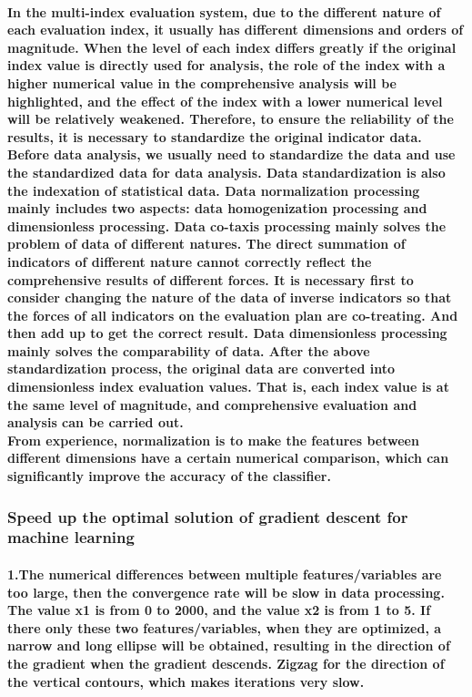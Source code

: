 \documentclass{article}
\begin{document}
\paragraph{In the multi-index evaluation system, due to the different nature of each evaluation index, it usually has different dimensions and orders of magnitude. When the level of each index differs greatly if the original index value is directly used for analysis, the role of the index with a higher numerical value in the comprehensive analysis will be highlighted, and the effect of the index with a lower numerical level will be relatively weakened. Therefore, to ensure the reliability of the results, it is necessary to standardize the original indicator data.
\\Before data analysis, we usually need to standardize the data and use the standardized data for data analysis. Data standardization is also the indexation of statistical data. Data normalization processing mainly includes two aspects: data homogenization processing and dimensionless processing. Data co-taxis processing mainly solves the problem of data of different natures. The direct summation of indicators of different nature cannot correctly reflect the comprehensive results of different forces. It is necessary first to consider changing the nature of the data of inverse indicators so that the forces of all indicators on the evaluation plan are co-treating. And then add up to get the correct result. Data dimensionless processing mainly solves the comparability of data. After the above standardization process, the original data are converted into dimensionless index evaluation values. That is, each index value is at the same level of magnitude, and comprehensive evaluation and analysis can be carried out.
\\From experience, normalization is to make the features between different dimensions have a certain numerical comparison, which can significantly improve the accuracy of the classifier.}

\subsubsection{Speed up the optimal solution of gradient descent for machine learning}
\paragraph{1.The numerical differences between multiple features/variables are too large, then the convergence rate will be slow in data processing. The value x1 is from 0 to 2000, and the value x2 is from 1 to 5. If there only these two features/variables, when they are optimized, a narrow and long ellipse will be obtained, resulting in the direction of the gradient when the gradient descends. Zigzag for the direction of the vertical contours, which makes iterations very slow.}
\end{document}
